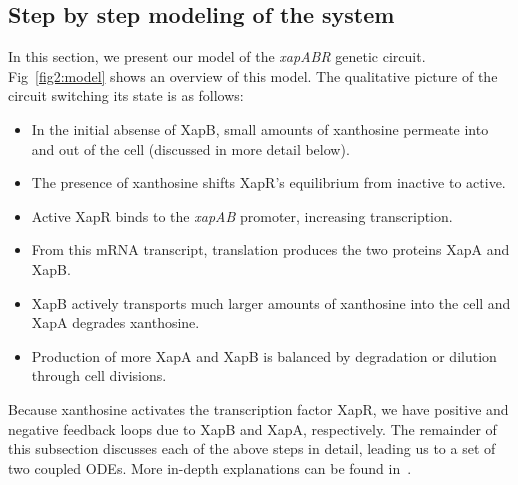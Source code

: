\documentclass[10pt,letterpaper]{article}
\begin{document}
	\subsection*{Step by step modeling of the system}
	In this section, we present our model of the \emph{xapABR} genetic circuit.
	Fig~\ref{fig2:model} shows an overview of this model.
	The qualitative picture of the circuit switching its state is as follows:
	\begin{itemize}
		\item In the initial absense of XapB, small amounts of xanthosine permeate
				into and out of the cell (discussed in more detail below).
		\item The presence of xanthosine shifts XapR's equilibrium from inactive to active.
		\item Active XapR binds to the \emph{xapAB} promoter, increasing transcription.
		\item From this mRNA transcript, translation produces the two proteins XapA and XapB.
		\item XapB actively transports much larger amounts of xanthosine into the cell and XapA degrades xanthosine.
		\item Production of more XapA and XapB is balanced by degradation or dilution through cell divisions.
	\end{itemize}
	Because xanthosine activates the transcription factor XapR, we have positive
	and negative feedback loops due to XapB and XapA, respectively. The remainder
	of this subsection discusses each of the above steps in detail, leading us
	to a set of two coupled ODEs. More in-depth explanations can be found
	in~.
	
\end{document}
